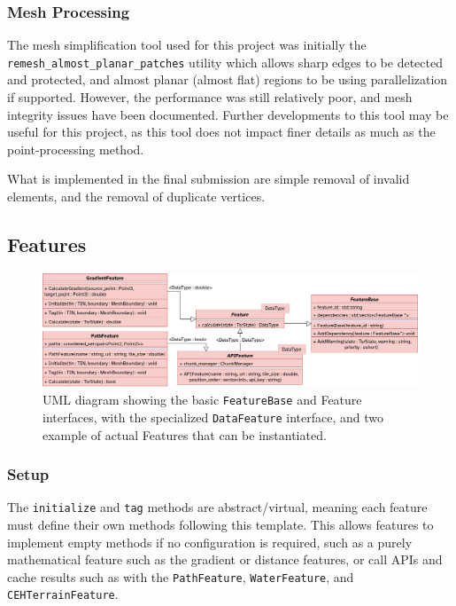 \documentclass[12pt]{article}
\begin{document}
\subsubsection{Mesh Processing}

The mesh simplification tool used for this project was initially the \texttt{remesh\_almost\_planar\_patches} utility which allows sharp edges to be detected and protected, and almost planar (almost flat) regions to be using parallelization if supported. However, the performance was still relatively poor, and mesh integrity issues have been documented. Further developments to this tool may be useful for this project, as this tool does not impact finer details as much as the point-processing method.

What is implemented in the final submission are simple removal of invalid elements, and the removal of duplicate vertices.

\subsection{Features}

\begin{figure}[H]
  \centering
  \includegraphics[width=\textwidth]{assets/FeatureBase.png}
  \caption{UML diagram showing the basic \texttt{FeatureBase} and Feature interfaces, with the specialized \texttt{DataFeature} interface, and two example of actual Features that can be instantiated.}\label{impl:features:uml}
\end{figure}

\subsubsection{Setup}

The \texttt{initialize} and \texttt{tag} methods are abstract/virtual, meaning each feature must define their own methods following this template. This allows features to implement empty methods if no configuration is required, such as a purely mathematical feature such as the gradient or distance features, or call APIs and cache results such as with the \texttt{PathFeature}, \texttt{WaterFeature}, and \texttt{CEHTerrainFeature}.
\end{document}
